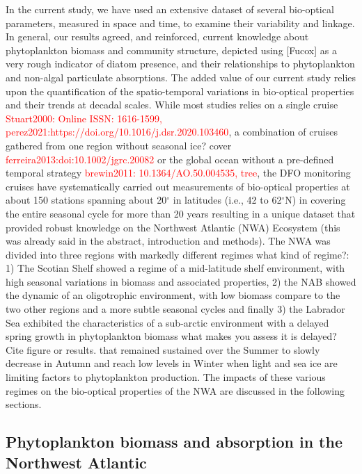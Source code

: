 \documentclass[utf8]{frontiersSCNS} %
\begin{document}
In the current study, we have used an extensive dataset of several bio-optical parameters, measured in space and time, to examine their variability and linkage. In general, our results agreed, and reinforced, current knowledge about phytoplankton biomass and community structure, depicted using [Fucox] as a very rough indicator of diatom presence, and their relationships to phytoplankton and non-algal particulate absorptions.  The added value of our current study relies upon the quantification of the spatio-temporal variations in bio-optical properties and their trends at decadal scales. While most studies relies on a single cruise \citep{stuart2000,perez2021} \textcolor{red}{Stuart2000: Online ISSN: 1616-1599, perez2021:https://doi.org/10.1016/j.dsr.2020.103460}, a combination of cruises gathered from one region without seasonal ice? cover \citep{ferreira2013,matsuoka2014} \textcolor{red}{ferreira2013:doi:10.1002/jgrc.20082} or the global ocean without a pre-defined temporal strategy \citep{tree2000,Ciotti2002,bricaud2004,Brewin2011} \textcolor{red}{brewin2011: 10.1364/AO.50.004535, tree}, the DFO monitoring cruises have systematically carried out measurements of bio-optical properties at about 150 stations spanning about 20$^\circ$ in latitudes (i.e., 42 to 62$^\circ$N) in covering the entire seasonal cycle for more than 20 years resulting in a unique dataset that provided robust knowledge on the Northwest Atlantic (NWA) Ecosystem (this was already said in the abstract, introduction and methods). The NWA was divided into three regions with markedly different regimes what kind of regime?: 1) The Scotian Shelf showed a regime of a mid-latitude shelf environment, with high seasonal variations in biomass and associated properties, 2) the NAB showed the dynamic of an oligotrophic environment, with low biomass compare to the two other regions and a more subtle seasonal cycles and finally 3) the Labrador Sea exhibited the characteristics of a sub-arctic environment with a delayed spring growth in phytoplankton biomass what makes you assess it is delayed? Cite figure or results. that remained sustained over the Summer to slowly decrease in Autumn and reach low levels in Winter when light and sea ice are limiting factors to phytoplankton production. The impacts of these various regimes on the bio-optical properties of the NWA are discussed in the following sections. 

\subsection{Phytoplankton biomass and absorption in the Northwest Atlantic}
\end{document}
